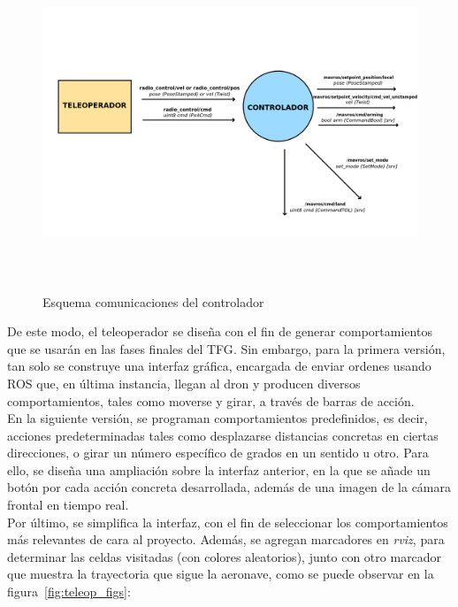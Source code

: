 \begin{figure} [t]
	\begin{center}
	\includegraphics[height=10cm]{imagenes/cap4/4_esquema_coms.png}
	\end{center}
	\caption[Esquema comunicaciones del controlador]{Esquema comunicaciones del controlador}
	\label{fig:diagrama}
\end{figure}

De este modo, el teleoperador se diseña con el fin de generar comportamientos que se usarán en las fases finales del \ac{TFG}. Sin embargo, para la primera versión, tan solo se construye una interfaz gráfica, encargada de enviar ordenes usando \ac{ROS} que, en última instancia, llegan al dron y producen diversos comportamientos, tales como moverse y girar, a través de barras de acción.\\

En la siguiente versión, se programan comportamientos predefinidos, es decir, acciones predeterminadas tales como desplazarse distancias concretas en ciertas direcciones, o girar un número específico de grados en un sentido u otro. Para ello, se diseña una ampliación sobre la interfaz anterior, en la que se añade un botón por cada acción concreta desarrollada, además de una imagen de la cámara frontal en tiempo real.\\

Por último, se simplifica la interfaz, con el fin de seleccionar los comportamientos más relevantes de cara al proyecto. Además, se agregan marcadores en \emph{rviz}, para determinar las celdas visitadas (con colores aleatorios), junto con otro marcador que muestra la trayectoria que sigue la aeronave, como se puede observar en la figura~\ref{fig:teleop_figs}:\\

